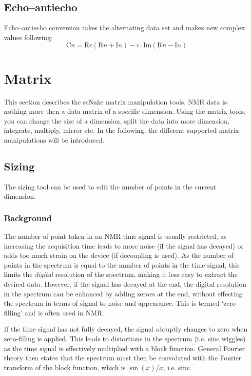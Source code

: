 \documentclass[11pt,a4paper]{article}
\begin{document}
\subsection{Echo--antiecho}
Echo--antiecho conversion takes the alternating data set and makes new complex values following:
\begin{equation*}
  \text{C}n = \text{Re}(\text{R}n + \text{I}n ) - i \cdot \text{Im}(\text{R}n - \text{I}n )
\end{equation*}



\section{Matrix}
This section describes the ssNake matrix manipulation tools. NMR data is nothing more then a data matrix of a specific dimension. Using the matrix tools, you can change the size of a dimension, split the data into more dimension, integrate, multiply, mirror etc. In the following, the different supported matrix manipulations will be introduced.


\subsection{Sizing}
The sizing tool can be used to edit the number of points in the current dimension. 

\subsubsection*{Background}
The number of point taken in an NMR time signal is usually restricted, as increasing the acquisition time leads to more noise (if the signal has decayed) or adds too much strain on the device (if decoupling is used). As the number of points in the spectrum is equal to the number of points in the time signal, this limits the \textit{digital} resolution of the spectrum, making it less easy to extract the desired data. However, if the signal has decayed at the end, the digital resolution in the spectrum can be enhanced by adding zeroes at the end, without effecting the spectrum in terms of signal-to-noise and appearance. This is termed `zero filling' and is often used in NMR.

If the time signal has not fully decayed, the signal abruptly changes to zero when zero-filling is applied. This leads to distortions in the spectrum (i.e. sinc wiggles) as the time signal is effectively multiplied with a block function. General Fourier theory then states that the spectrum must then be convoluted with the Fourier transform of the block function, which is $\sin(x)/x$, i.e. sinc.
\end{document}
